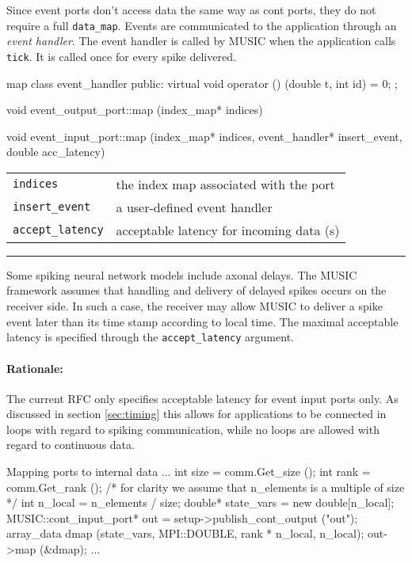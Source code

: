\documentclass[a4paper]{report}
\makeatletter
\newenvironment{rationale}%
{\par\paragraph{Rationale:}}%
{\par}
\newenvironment{parameters}%
{\begin{tabular}{@{\hspace{2em}}lp{0.6\textwidth}}}%
{\end{tabular}\par\vspace{1mm}\par\hrule\par\vspace{5mm}}
\makeatother
\begin{document}
Since event ports don't access data the same way as cont ports, they
do not require a full \lstinline|data_map|.  Events are communicated
to the application through an \emph{event handler}.  The event handler is called by MUSIC when the application
calls \lstinline|tick|.  It is called once for every spike delivered.

\pagebreak
\begin{head}{map}
  class event_handler {
  public:
    virtual void operator () (double t, int id) = 0;
  };
  
  void event_output_port::map (index_map* indices)

  void event_input_port::map (index_map* indices,
                              event_handler* insert_event,
                              double acc_latency)
\end{head}
\begin{parameters}
  \lstinline|indices| & the index map associated with the port \\
  \lstinline|insert_event| & a user-defined event handler \\
  \lstinline|accept_latency| & acceptable latency for incoming data (s)
  \\
\end{parameters}

Some spiking neural network models include axonal delays.  The MUSIC
framework assumes that handling and delivery of delayed spikes occurs
on the receiver side.  In such a case, the receiver may allow MUSIC to
deliver a spike event later than its time stamp according to local
time.  The maximal acceptable latency is specified through the
\lstinline|accept_latency| argument.
  
\begin{rationale}
The current RFC only specifies acceptable latency for event input
ports only.  As discussed in section \ref{sec:timing} this allows for
applications to be connected in loops with regard to spiking
communication, while no loops are allowed with regard to continuous
data.
\end{rationale}

\begin{code}{Mapping ports to internal data\label{code:mapping}}
{
  ...
  int size = comm.Get_size ();
  int rank = comm.Get_rank ();
  /* for clarity we assume that n_elements
     is a multiple of size */
  int n_local = n_elements / size;
  double* state_vars = new double[n_local];
  MUSIC::cont_input_port* out =
     setup->publish_cont_output ("out");
  array_data dmap (state_vars, MPI::DOUBLE,
                   rank * n_local, n_local);
  out->map (&dmap);
  ...
}
\end{code}
\end{document}
